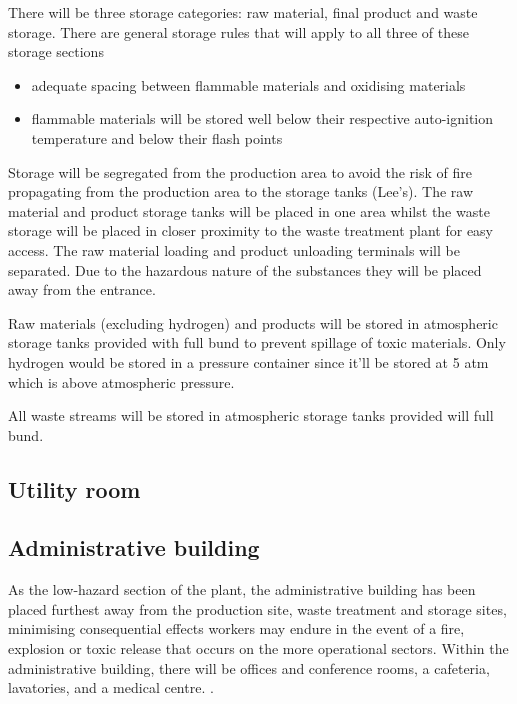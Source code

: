 There will be three storage categories: raw material, final product and waste storage. There are general storage rules that will apply to all three of these storage sections 

\begin{itemize}
    \item adequate spacing between flammable materials and oxidising materials 
    \item flammable materials will be stored well below their respective auto-ignition temperature and below their flash points
\end{itemize}

Storage will be segregated from the production area to avoid the risk of fire propagating from the production area to the storage tanks (Lee's). The raw material and product storage tanks will be placed in one area whilst the waste storage will be placed in closer proximity to the waste treatment plant for easy access. The raw material loading and product unloading terminals will be separated. Due to the hazardous nature of the substances they will be placed away from the entrance. 

Raw materials (excluding hydrogen) and products will be stored in atmospheric storage tanks provided with full bund to prevent spillage of toxic materials. Only hydrogen would be stored in a pressure container since it'll be stored at 5 atm which is above atmospheric pressure.  

All waste streams will be stored in atmospheric storage tanks provided will full bund.


\subsection{Utility room}


\subsection{Administrative building}

As the low-hazard section of the plant, the administrative building has been placed furthest away from the production site, waste treatment and storage sites, minimising  consequential effects workers may endure in the event of a fire, explosion or toxic release that occurs on the more operational sectors. Within the administrative building, there will be offices and conference rooms, a cafeteria, lavatories, and a medical centre. \cite{sinnott_coulson_2005}. 